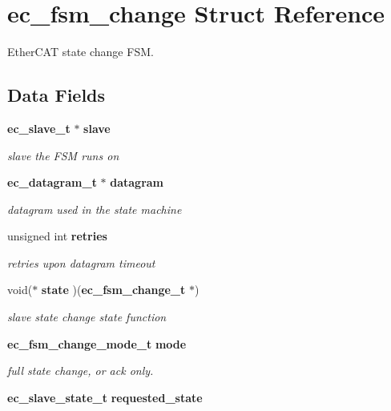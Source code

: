 \section{ec\-\_\-fsm\-\_\-change Struct Reference}
\label{structec__fsm__change}


Ether\-C\-A\-T state change F\-S\-M.  


\subsection*{Data Fields}
\begin{DoxyCompactItemize}
\item 
{\bf ec\-\_\-slave\-\_\-t} $\ast$ {\bf slave}\label{structec__fsm__change_ae3843c25b9fd49665931655cafc21b3d}

\begin{DoxyCompactList}\small\item\em slave the F\-S\-M runs on \end{DoxyCompactList}\item 
{\bf ec\-\_\-datagram\-\_\-t} $\ast$ {\bf datagram}\label{structec__fsm__change_ab273d6047105421f11b993301269dea3}

\begin{DoxyCompactList}\small\item\em datagram used in the state machine \end{DoxyCompactList}\item 
unsigned int {\bf retries}\label{structec__fsm__change_a00a1bc8fab1ccbed6b723bebb19ae34b}

\begin{DoxyCompactList}\small\item\em retries upon datagram timeout \end{DoxyCompactList}\item 
void($\ast$ {\bf state} )({\bf ec\-\_\-fsm\-\_\-change\-\_\-t} $\ast$)\label{structec__fsm__change_a3026434d1cab8f98a4ca535ae6a54382}

\begin{DoxyCompactList}\small\item\em slave state change state function \end{DoxyCompactList}\item 
{\bf ec\-\_\-fsm\-\_\-change\-\_\-mode\-\_\-t} {\bf mode}
\begin{DoxyCompactList}\small\item\em full state change, or ack only. \end{DoxyCompactList}\item 
{\bf ec\-\_\-slave\-\_\-state\-\_\-t} {\bf requested\-\_\-state}\label{structec__fsm__change_a64a969bd6bad475ff30870eed7f79266}


\end{DoxyCompactItemize}
